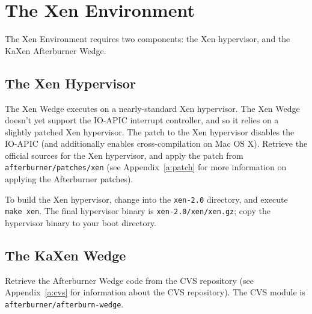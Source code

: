 \documentclass[twoside,a4paper]{report}
\newcommand{\code}[1]{{\tt #1}}
\newcommand{\cmd}[1]{\code{#1}}
\begin{document}
\section{The Xen Environment}

The Xen Environment requires two components: the Xen hypervisor, and
the KaXen Afterburner Wedge.

\subsection{The Xen Hypervisor}

The Xen Wedge executes on a nearly-standard Xen hypervisor.  The Xen
Wedge doesn't yet support the IO-APIC interrupt controller, and so it
relies on a slightly patched Xen hypervisor.  The patch to the Xen
hypervisor disables the IO-APIC (and additionally enables
cross-compilation on Mac OS X).  Retrieve the official sources for
the Xen hypervisor, and apply the patch from
\code{afterburner/patches/xen} (see Appendix~\ref{a:patch} for more
information on applying the Afterburner patches).

To build the Xen hypervisor, change into the
\code{xen-2.0} directory, and execute \cmd{make xen}.
The final hypervisor binary is \code{xen-2.0/xen/xen.gz}; copy
the hypervisor binary to your boot directory.

\subsection{The KaXen Wedge}

Retrieve the Afterburner Wedge code from the CVS repository (see
Appendix~\ref{a:cvs} for information about the CVS repository).  The
CVS module is \code{afterburner/afterburn-wedge}.
\end{document}
